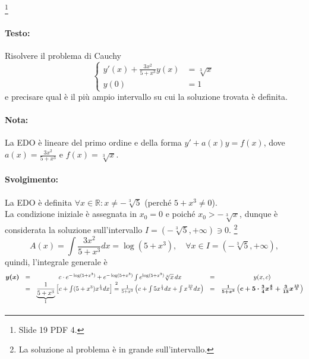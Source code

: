 \begin{example}\footnote{Slide 19 PDF 4.}
    \paragraph{Testo:} Risolvere il problema di Cauchy
    \begin{equation*}
        \begin{cases}
            y'(x)+\frac{3x^2}{5+x^3}y(x) &= \sqrt[3]{x}\\
            y(0) &= 1
        \end{cases}
    \end{equation*}
    e precisare qual è il più ampio intervallo su cui la soluzione trovata è definita.
    \paragraph{Nota:} La EDO è lineare del primo ordine e della forma $y'+a(x)y=f(x)$, dove $a(x)=\frac{3x^2}{5+x^3}$ e $f(x) = \sqrt[3]{x}$.
    \paragraph{Svolgimento:} La EDO è definita $\forall x\in\mathbb R : x\neq-\sqrt[3]{5}$ (perché $5+x^3\neq 0$).\\
    La condizione iniziale è assegnata in $x_0=0$ e poiché $x_0>-\sqrt[3]{x}$, dunque è considerata la soluzione sull'intervallo $I=(-\sqrt[3]{5}, +\infty)\ni 0$. \footnote{La soluzione al problema è in grande sull'intervallo.}\\
    \begin{equation*}
        A(x) = \int \frac{3x^2}{5+x^3} dx = \log(5+x^3),\quad \forall x\in I=(-\sqrt[3]{5}, +\infty),
    \end{equation*}
    quindi, l'integrale generale è
    \begin{equation*}
        \begin{matrix}
            \boldsymbol{y(x)} &=& c\cdot e^{-\log(5+x^3)} + e^{-\log(5+x^3)}\int e^{\log(5+x^3)} \sqrt[3]{x}\, dx &=& y(x,c)\\
            &=& \underbrace{\frac{1}{5+x^3}}_{\footnotemark}\left[c+\int (5+x^3)x^{\frac{1}{3}}dx\right] \overset{\footnotemark}{=} \frac{1}{5+x^3}\left(c+\int 5x^{\frac{1}{3}}dx+\int x^{\frac{10}{3}} dx\right) &=& \boldsymbol{\frac{1}{5+x^3}\left(c+5\cdot\frac{3}{4}x^{\frac{4}{3}} + \frac{3}{13}x^{\frac{13}{3}}\right)}
        \end{matrix}
    \end{equation*}
    \addtocounter{footnote}{-1}


\end{example}
